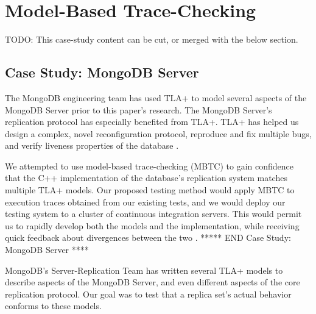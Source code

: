\documentclass{vldb}
\begin{document}
\section{Model-Based Trace-Checking}
\label{sec:model_based_trace_checking}

TODO: This case-study content can be cut, or merged with the below section.
\subsection{Case Study: MongoDB Server}
The MongoDB engineering team has used TLA+ to model several aspects of the MongoDB Server prior to this paper's research.
The MongoDB Server's replication protocol has especially benefited from TLA+.
TLA+ has helped us design a complex, novel reconfiguration protocol, reproduce and fix multiple bugs, and verify liveness properties of the database \cite{Schultz19BugsLife}.

We attempted to use model-based trace-checking (MBTC) \cite{MBTC} to gain confidence that the C++ implementation of the database's replication system matches multiple TLA+ models.
Our proposed testing method would apply MBTC to execution traces obtained from our existing tests, and we would deploy our testing system to a cluster of continuous integration servers.
This would permit us to rapidly develop both the models and the implementation, while receiving quick feedback about divergences between the two \cite{Gravell11ConcurrentDevelopmentOfModelAndImplementation}.
***** END Case Study: MongoDB Server ****




MongoDB's Server-Replication Team has written several TLA+ models to describe aspects of the MongoDB Server, and even different aspects of the core replication protocol. 
Our goal was to test that a replica set's actual behavior conforms to these models.
\end{document}
